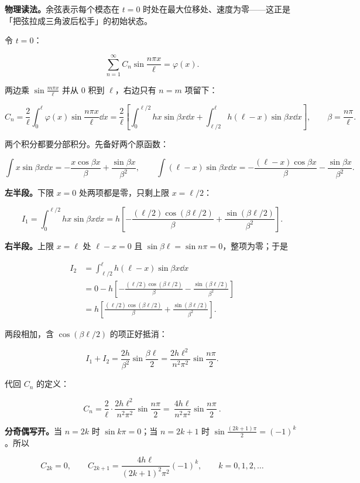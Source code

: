 \textbf{物理读法。}余弦表示每个模态在 $t=0$ 时处在最大位移处、速度为零——这正是「把弦拉成三角波后松手」的初始状态。


令 $t=0$：

\[
\sum_{n=1}^{\infty}C_n\sin\frac{n\pi x}{\ell}=\varphi(x).
\]

两边乘 $\sin\frac{m\pi x}{\ell}$ 并从 $0$ 积到 $\ell$，右边只有 $n=m$ 项留下：

\[
C_n=\frac{2}{\ell}\int_0^{\ell}\varphi(x)\sin\frac{n\pi x}{\ell}\dd x
=\frac{2}{\ell}\left[\int_0^{\ell/2}hx\sin\beta x\dd x+\int_{\ell/2}^{\ell}h(\ell-x)\sin\beta x\dd x\right],
\qquad \beta=\frac{n\pi}{\ell}.
\]

两个积分都要分部积分。先备好两个原函数：

\[
\int x\sin\beta x\dd x=-\frac{x\cos\beta x}{\beta}+\frac{\sin\beta x}{\beta^2},
\qquad
\int(\ell-x)\sin\beta x\dd x=-\frac{(\ell-x)\cos\beta x}{\beta}-\frac{\sin\beta x}{\beta^2}.
\]

\textbf{左半段。}下限 $x=0$ 处两项都是零，只剩上限 $x=\ell/2$：

\[
I_1=\int_0^{\ell/2}hx\sin\beta x\dd x
=h\left[-\frac{(\ell/2)\cos(\beta\ell/2)}{\beta}+\frac{\sin(\beta\ell/2)}{\beta^2}\right].
\]

\textbf{右半段。}上限 $x=\ell$ 处 $\ell-x=0$ 且 $\sin\beta\ell=\sin n\pi=0$，整项为零；于是

\[
\begin{aligned}
I_2&=\int_{\ell/2}^{\ell}h(\ell-x)\sin\beta x\dd x\\
&=0-h\left[-\frac{(\ell/2)\cos(\beta\ell/2)}{\beta}-\frac{\sin(\beta\ell/2)}{\beta^2}\right]\\
&=h\left[\frac{(\ell/2)\cos(\beta\ell/2)}{\beta}+\frac{\sin(\beta\ell/2)}{\beta^2}\right].
\end{aligned}
\]

两段相加，含 $\cos(\beta\ell/2)$ 的项正好抵消：

\[
I_1+I_2=\frac{2h}{\beta^2}\sin\frac{\beta\ell}{2}
=\frac{2h\ell^2}{n^2\pi^2}\sin\frac{n\pi}{2}.
\]

代回 $C_n$ 的定义：

\[
C_n=\frac{2}{\ell}\cdot\frac{2h\ell^2}{n^2\pi^2}\sin\frac{n\pi}{2}
=\boxed{\ \frac{4h\ell}{n^2\pi^2}\sin\frac{n\pi}{2}\ }.
\]

\textbf{分奇偶写开。}当 $n=2k$ 时 $\sin k\pi=0$；当 $n=2k+1$ 时 $\sin\frac{(2k+1)\pi}{2}=(-1)^k$。所以

\[
C_{2k}=0,
\qquad
C_{2k+1}=\frac{4h\ell}{(2k+1)^2\pi^2}(-1)^k,
\qquad k=0,1,2,\dots
\]

